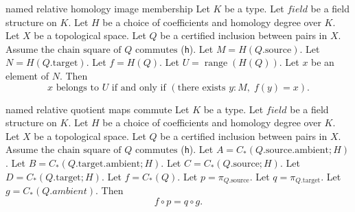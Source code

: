 \begin{cleanresult}{named relative homology image membership}
Let $K$ be a type.
Let $\mathit{field}$ be a field structure on $K$.
Let $H$ be a choice of coefficients and homology degree over $K$.
Let $X$ be a topological space.
Let $Q$ be a certified inclusion between pairs in $X$.
Assume $\text{the chain square of }Q\text{ commutes}$ (\texttt{h}).
Let $M = H(Q.\mathrm{source})$.
Let $N = H(Q.\mathrm{target})$.
Let $f = H(Q)$.
Let $U = \operatorname{range}(H(Q))$.
Let $x$ be an element of $N$.
Then \[x\text{ belongs to }U\text{ if and only if }\left(\text{there exists }y : M,\; f(y)=x\right).\]
\par{}
\end{cleanresult}

\begin{cleanresult}{named relative quotient maps commute}
Let $K$ be a type.
Let $\mathit{field}$ be a field structure on $K$.
Let $H$ be a choice of coefficients and homology degree over $K$.
Let $X$ be a topological space.
Let $Q$ be a certified inclusion between pairs in $X$.
Assume $\text{the chain square of }Q\text{ commutes}$ (\texttt{h}).
Let $A = C_*(Q.\mathrm{source}.\mathrm{ambient};H)$.
Let $B = C_*(Q.\mathrm{target}.\mathrm{ambient};H)$.
Let $C = C_*(Q.\mathrm{source};H)$.
Let $D = C_*(Q.\mathrm{target};H)$.
Let $f = C_*(Q)$.
Let $p = \pi_{Q.\mathrm{source}}$.
Let $q = \pi_{Q.\mathrm{target}}$.
Let $g = C_*(Q.ambient)$.
Then \[f\circ p=q\circ g.\]
\par{}
\end{cleanresult}

